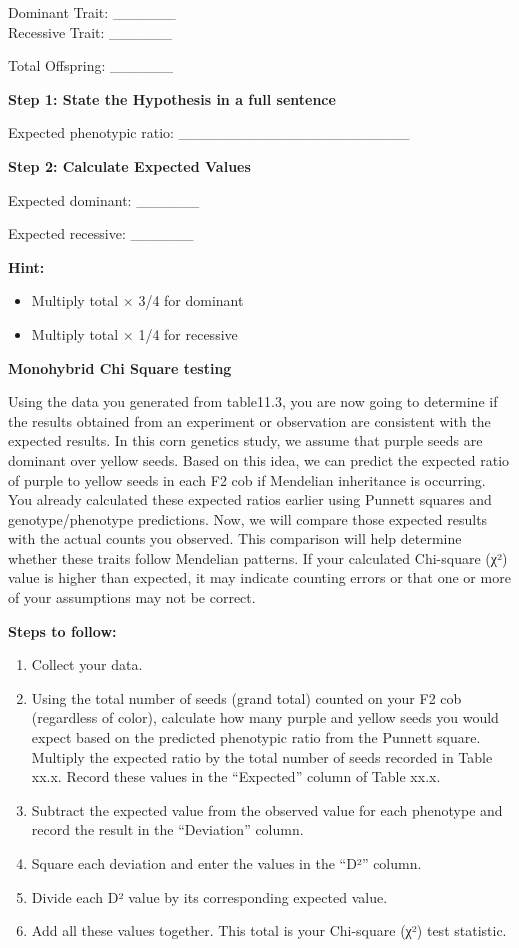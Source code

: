 \documentclass[
  letterpaper,
  DIV=11,
  numbers=noendperiod]{scrreprt}
\begin{document}
Dominant Trait: \_\_\_\_\_\_\\
Recessive Trait: \_\_\_\_\_\_

Total Offspring: \_\_\_\_\_\_

\textbf{Step 1: State the Hypothesis in a full sentence}

Expected phenotypic ratio: \_\_\_\_\_\_\_\_\_\_\_\_\_\_\_\_\_\_\_\_\_\_

\textbf{Step 2: Calculate Expected Values}

Expected dominant: \_\_\_\_\_\_

Expected recessive: \_\_\_\_\_\_

\textbf{Hint:}

\begin{itemize}
\item
  Multiply total × 3/4 for dominant
\item
  Multiply total × 1/4 for recessive
\end{itemize}

\textbf{Monohybrid Chi Square testing}

Using the data you generated from table11.3, you are now going to
determine if the results obtained from an experiment or observation are
consistent with the expected results. In this corn genetics study, we
assume that purple seeds are dominant over yellow seeds. Based on this
idea, we can predict the expected ratio of purple to yellow seeds in
each F2 cob if Mendelian inheritance is occurring. You already
calculated these expected ratios earlier using Punnett squares and
genotype/phenotype predictions. Now, we will compare those expected
results with the actual counts you observed. This comparison will help
determine whether these traits follow Mendelian patterns. If your
calculated Chi-square (χ²) value is higher than expected, it may
indicate counting errors or that one or more of your assumptions may not
be correct.

\textbf{Steps to follow:}

\begin{enumerate}
\def\labelenumi{\arabic{enumi}.}
\item
  Collect your data.
\item
  Using the total number of seeds (grand total) counted on your F2 cob
  (regardless of color), calculate how many purple and yellow seeds you
  would expect based on the predicted phenotypic ratio from the Punnett
  square. Multiply the expected ratio by the total number of seeds
  recorded in Table xx.x. Record these values in the ``Expected'' column
  of Table xx.x.
\item
  Subtract the expected value from the observed value for each phenotype
  and record the result in the ``Deviation'' column.
\item
  Square each deviation and enter the values in the ``D²'' column.
\item
  Divide each D² value by its corresponding expected value.
\item
  Add all these values together. This total is your Chi-square (χ²) test
  statistic.
\end{enumerate}
\end{document}
